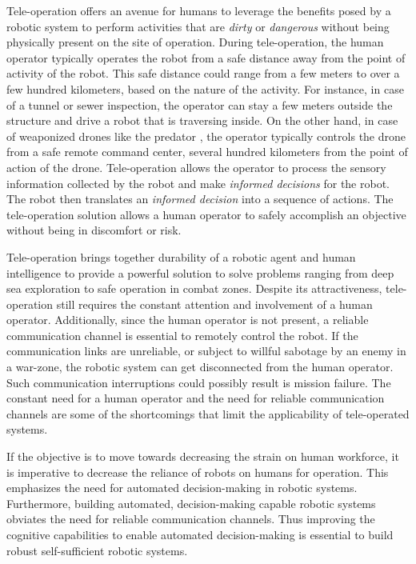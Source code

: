 \documentclass {udthesis}
\begin{document}
Tele-operation offers an avenue for humans to leverage the benefits posed by a robotic system to perform activities 
that are \emph{dirty} or \emph{dangerous} without being physically present on the site of operation. During tele-operation, the human operator 
typically operates the robot from a safe distance away from the point of activity of the robot. This safe distance could range from a few meters to over a few hundred kilometers, based on the nature of the activity. For instance, in case of a tunnel or sewer inspection, the operator can stay a few meters outside the structure and drive a robot that is traversing inside. On the other hand, in case of weaponized drones like the predator \cite{predator}, the operator typically controls the drone from a safe remote command center, several hundred kilometers from the point of action of the drone. Tele-operation allows the operator to process the sensory information collected by the robot and make \emph{informed decisions} for the robot. The robot then translates an \emph{informed decision} into a sequence of actions. The tele-operation solution allows a human operator to safely accomplish an objective 
without being in discomfort or risk. 

Tele-operation brings together durability of a robotic agent and human intelligence to provide a powerful solution to solve problems ranging from deep sea exploration to safe operation in combat zones. Despite its attractiveness, tele-operation still requires the constant attention and involvement of a human operator. Additionally, since the human operator is not present, a reliable communication channel is essential to remotely control the robot. If the communication links are unreliable, or subject to willful sabotage by an enemy in a war-zone, the robotic system can get disconnected from the human operator. Such communication interruptions could possibly result is mission failure. The constant need for a human operator and the need for reliable communication channels are some of the shortcomings that limit the applicability of tele-operated systems.

If the objective is to move towards decreasing the strain on human workforce, it is imperative to decrease the reliance of robots on humans for operation. This emphasizes the need for automated decision-making in robotic systems. Furthermore, building automated, decision-making capable robotic systems obviates the need for reliable communication channels. Thus improving the cognitive capabilities to enable automated decision-making is essential to build robust self-sufficient robotic systems.
\end{document}
